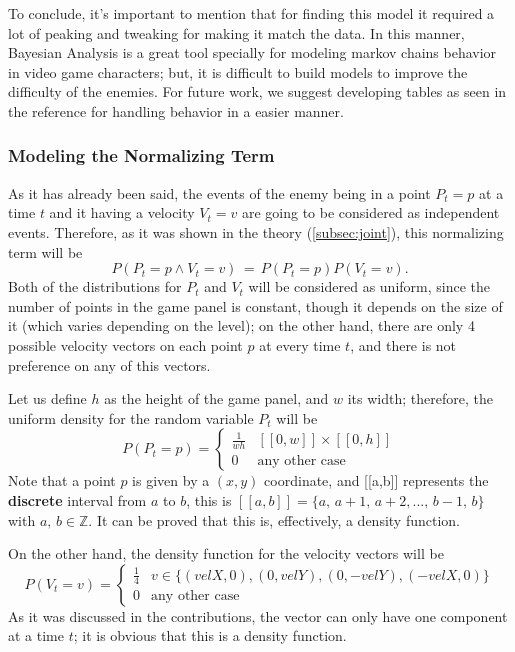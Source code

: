 To conclude, it's important to mention that for finding this model it required a lot of peaking and tweaking for making it match the data. In this manner, Bayesian Analysis is a great tool specially for modeling markov chains behavior in video game characters; but, it is difficult to build models to improve the difficulty of the enemies. For future work, we suggest developing tables as seen in the reference \cite{coue2003using} for handling behavior in a easier manner.


\subsubsection{Modeling the Normalizing Term}
As it has already been said, the events of the enemy being in a point $P_t=p$ at a time $t$ and it having a velocity $V_t=v$ are going to be considered as independent events. Therefore, as it was shown in the theory (\ref{subsec:joint}), this normalizing term will be
\begin{equation*}
	P(P_t=p\wedge V_t=v)\,=\,P(P_t=p)P(V_t=v).
\end{equation*}
 Both of the distributions for $P_t$ and $V_t$ will be considered as uniform, since the number of points in the game panel is constant, though it depends on the size of it (which varies depending on the level); on the other hand, there are only 4 possible velocity vectors on each point $p$ at every time $t$, and there is not preference on any of this vectors.
 
Let us define $h$ as the height of the game panel, and $w$ its width; therefore, the uniform density for the random variable $P_t$ will be
\begin{equation}
	P\left( P_{t}=p \right)=
    \begin{cases}
    \frac{1}{wh} & [[0,w]]\times[[0,h]] \\ 
    0 & \text{any other case}
    \end{cases}
\end{equation}
Note that a point $p$ is given by a $(x,y)$ coordinate, and [[a,b]] represents the \textbf{discrete} interval from $a$ to $b$, this is $[[a,b]]=\{a,\,a+1,\,a+2,...,\,b-1,\,b\}$ with $a,\,b\in\mathbb{Z}$. It can be proved that this is, effectively, a density function.

On the other hand, the density function for the velocity vectors will be
\begin{equation}
	P\left( V_{t}=v \right)=
    \begin{cases}
    \frac{1}{4} &  v\in\{(velX,0),(0,velY),(0,-velY),(-velX,0)\}\\ 
    0 & \text{any other case}
    \end{cases}
\end{equation}
As it was discussed in the contributions, the vector can only have one component at a time $t$; it is obvious that this is a density function.


